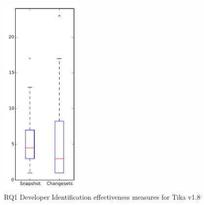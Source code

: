 
\begin{figure}[t]
\centering
\includegraphics[width=0.36\textwidth]{figures/dit/rq1_tika}
\caption{RQ1 Developer Identification effectiveness measures for Tika v1.8}
\label{fig:dit:rq1:tika}
\end{figure}
